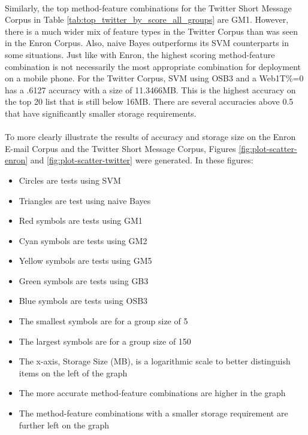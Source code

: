 \paragraph*{} Similarly, the top method-feature combinations for the Twitter Short Message Corpus in Table \ref{tab:top_twitter_by_score_all_groups} are GM1.  However, there is a much wider mix of feature types in the Twitter Corpus than was seen in the Enron Corpus.  Also, naive Bayes outperforms its SVM counterparts in some situations.  Just like with Enron, the highest scoring method-feature combination is not necessarily the most appropriate combination for deployment on a mobile phone.  For the Twitter Corpus, SVM using OSB3 and a Web1T\%=0 has a .6127 accuracy with a size of 11.3466MB.  This is the highest accuracy on the top 20 list that is still below 16MB.  There are several accuracies above 0.5 that have significantly smaller storage requirements.

\paragraph*{} To more clearly illustrate the results of accuracy and storage size on the Enron E-mail Corpus and the Twitter Short Message Corpus, Figures \ref{fig:plot-scatter-enron} and \ref{fig:plot-scatter-twitter} were generated.  In these figures:
	\begin{itemize}
		\item Circles are tests using SVM
		\item Triangles are test using naive Bayes
		\item Red symbols are tests using GM1
		\item Cyan symbols are tests using GM2
		\item Yellow symbols are tests using GM5
		\item Green symbols are tests using GB3
		\item Blue symbols are tests using OSB3
		\item The smallest symbols are for a group size of 5
		\item The largest symbols are for a group size of 150
		\item The x-axis, Storage Size (MB), is a logarithmic scale to better distinguish items on the left of the graph
		\item The more accurate method-feature combinations are higher in the graph
		\item The method-feature combinations with a smaller storage requirement are further left on the graph
	\end{itemize}
		
